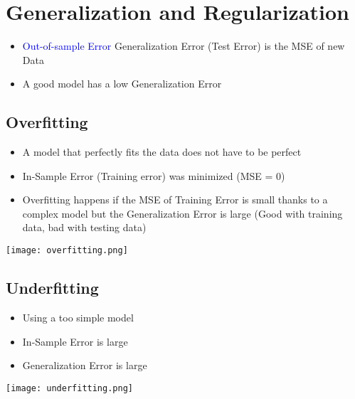 \section{Generalization and Regularization}
\begin{itemize}
    \item \textcolor{blue}{Out-of-sample Error} Generalization Error (Test Error) is the MSE of new Data
    \item A good model has a low Generalization Error
\end{itemize}

\subsection{Overfitting}
\begin{itemize}
    \item A model that perfectly fits the data does not have to be perfect
    \item In-Sample Error (Training error) was minimized (MSE = 0)
    \item Overfitting happens if the MSE of Training Error is small thanks to a complex model but the Generalization Error is large (Good with training data, bad with testing data)
\end{itemize}
\texttt{[image: overfitting.png]}

\subsection{Underfitting}
\begin{itemize}
    \item Using a too simple model
    \item In-Sample Error is large
    \item Generalization Error is large
\end{itemize}

\texttt{[image: underfitting.png]}


